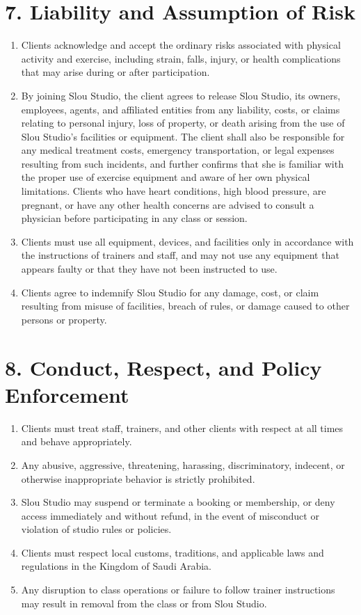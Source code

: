 \documentclass[12pt,a4paper]{article}
\begin{document}
\section*{7. Liability and Assumption of Risk}
\begin{enumerate}
    \item Clients acknowledge and accept the ordinary risks associated with physical activity and exercise, including strain, falls, injury, or health complications that may arise during or after participation.
    \item By joining Slou Studio, the client agrees to release Slou Studio, its owners, employees, agents, and affiliated entities from any liability, costs, or claims relating to personal injury, loss of property, or death arising from the use of Slou Studio’s facilities or equipment. The client shall also be responsible for any medical treatment costs, emergency transportation, or legal expenses resulting from such incidents, and further confirms that she is familiar with the proper use of exercise equipment and aware of her own physical limitations. Clients who have heart conditions, high blood pressure, are pregnant, or have any other health concerns are advised to consult a physician before participating in any class or session.
    \item Clients must use all equipment, devices, and facilities only in accordance with the instructions of trainers and staff, and may not use any equipment that appears faulty or that they have not been instructed to use.
    \item Clients agree to indemnify Slou Studio for any damage, cost, or claim resulting from misuse of facilities, breach of rules, or damage caused to other persons or property.
\end{enumerate}

\section*{8. Conduct, Respect, and Policy Enforcement}
\begin{enumerate}
    \item Clients must treat staff, trainers, and other clients with respect at all times and behave appropriately.
    \item Any abusive, aggressive, threatening, harassing, discriminatory, indecent, or otherwise inappropriate behavior is strictly prohibited.
    \item Slou Studio may suspend or terminate a booking or membership, or deny access immediately and without refund, in the event of misconduct or violation of studio rules or policies.
    \item Clients must respect local customs, traditions, and applicable laws and regulations in the Kingdom of Saudi Arabia.
    \item Any disruption to class operations or failure to follow trainer instructions may result in removal from the class or from Slou Studio.
\end{enumerate}
\end{document}
